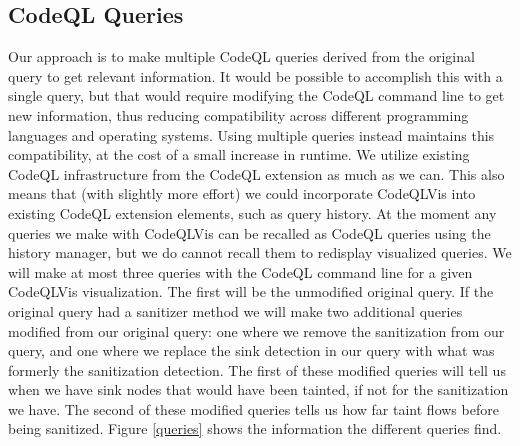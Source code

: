 \documentclass[sigplan,10pt,review]{acmart}
\begin{document}
\subsection{CodeQL Queries}
Our approach is to make multiple CodeQL queries derived from the original query to get relevant information. It would be possible to accomplish this with a single query, but that would require modifying the CodeQL command line to get new information, thus reducing compatibility across different programming languages and operating systems. Using multiple queries instead maintains this compatibility, at the cost of a small increase in runtime.
\newline
\indent We utilize existing CodeQL infrastructure from the CodeQL extension as much as we can. This also means that (with slightly more effort) we could incorporate CodeQLVis into existing CodeQL extension elements, such as query history. At the moment any queries we make with CodeQLVis can be recalled as CodeQL queries using the history manager, but we do cannot recall them to redisplay visualized queries.
\newline
\indent We will make at most three queries with the CodeQL command line for a given CodeQLVis visualization. The first will be the unmodified original query. If the original query had a sanitizer method we will make two additional queries modified from our original query: one where we remove the sanitization from our query, and one where we replace the sink detection in our query with what was formerly the sanitization detection. The first of these modified queries will tell us when we have sink nodes that would have been tainted, if not for the sanitization we have. The second of these modified queries tells us how far taint flows before being sanitized. Figure \ref{queries} shows the information the different queries find.
\newline
\end{document}
